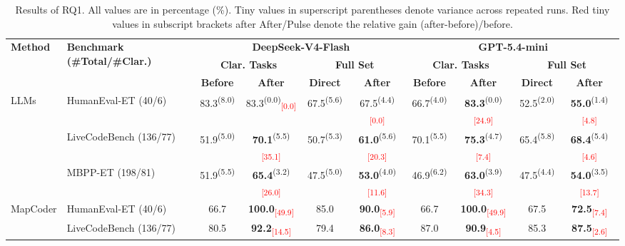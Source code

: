 \begin{table}[t]
\centering
\newcommand{\pv}[2]{#1\textsuperscript{\scriptsize(#2)}}
\newcommand{\gain}[1]{\textsubscript{\textcolor{red}{\scriptsize[#1]}}}
\caption{Results of RQ1. All values are in percentage (\%). Tiny values in superscript parentheses denote variance across repeated runs. Red tiny values in subscript brackets after After/Pulse denote the relative gain (after-before)/before.}
\label{tab:rq1_main_result}
\footnotesize
\setlength{\tabcolsep}{1.5pt}
\begin{tabular*}{\textwidth}{@{\extracolsep{\fill}}llcccccccc@{}}
\toprule
\multirow{3}{*}{\textbf{Method}} &
\multirow{3}{*}{\textbf{Benchmark (\#Total/\#Clar.)}} &
\multicolumn{4}{c}{\textbf{DeepSeek-V4-Flash}} &
\multicolumn{4}{c}{\textbf{GPT-5.4-mini}} \\
\cmidrule(lr){3-6}
\cmidrule(lr){7-10}
& &
\multicolumn{2}{c}{\textbf{Clar. Tasks}} &
\multicolumn{2}{c}{\textbf{Full Set}} &
\multicolumn{2}{c}{\textbf{Clar. Tasks}} &
\multicolumn{2}{c}{\textbf{Full Set}} \\
\cmidrule(lr){3-4}
\cmidrule(lr){5-6}
\cmidrule(lr){7-8}
\cmidrule(lr){9-10}
& &
\textbf{Before} & \textbf{After} &
\textbf{Direct} & \textbf{After} &
\textbf{Before} & \textbf{After} &
\textbf{Direct} & \textbf{After} \\
\midrule
\multirow{3}{*}{LLMs} & HumanEval-ET (40/6) & \pv{83.3}{8.0} & \pv{83.3}{0.0}\gain{0.0} & \pv{67.5}{5.6} & \pv{67.5}{4.4}\gain{0.0} & \pv{66.7}{4.0} & \pv{\textbf{83.3}}{0.0}\gain{24.9} & \pv{52.5}{2.0} & \pv{\textbf{55.0}}{1.4}\gain{4.8} \\
 & LiveCodeBench (136/77) & \pv{51.9}{5.0} & \pv{\textbf{70.1}}{5.5}\gain{35.1} & \pv{50.7}{5.3} & \pv{\textbf{61.0}}{5.6}\gain{20.3} & \pv{70.1}{5.5} & \pv{\textbf{75.3}}{4.7}\gain{7.4} & \pv{65.4}{5.8} & \pv{\textbf{68.4}}{5.4}\gain{4.6} \\
 & MBPP-ET (198/81) & \pv{51.9}{5.5} & \pv{\textbf{65.4}}{3.2}\gain{26.0} & \pv{47.5}{5.0} & \pv{\textbf{53.0}}{4.0}\gain{11.6} & \pv{46.9}{6.2} & \pv{\textbf{63.0}}{3.9}\gain{34.3} & \pv{47.5}{4.4} & \pv{\textbf{54.0}}{3.5}\gain{13.7} \\
\midrule
\multirow{3}{*}{MapCoder} & HumanEval-ET (40/6) & 66.7 & \textbf{100.0}\gain{49.9} & 85.0 & \textbf{90.0}\gain{5.9} & 66.7 & \textbf{100.0}\gain{49.9} & 67.5 & \textbf{72.5}\gain{7.4} \\
 & LiveCodeBench (136/77) & 80.5 & \textbf{92.2}\gain{14.5} & 79.4 & \textbf{86.0}\gain{8.3} & 87.0 & \textbf{90.9}\gain{4.5} & 85.3 & \textbf{87.5}\gain{2.6} \\

\end{tabular*}
\end{table}
